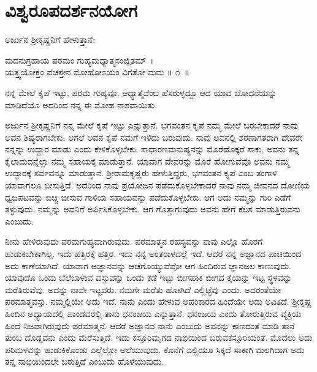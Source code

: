 
\chapter{ವಿಶ್ವರೂಪದರ್ಶನಯೋಗ}

ಅರ್ಜುನ ಶ‍್ರೀಕೃಷ್ಣನಿಗೆ ಹೇಳುತ್ತಾನೆ:

\begin{shloka}
ಮದನುಗ್ರಹಾಯ ಪರಮಂ ಗುಹ್ಯಮಧ್ಯಾತ್ಮಸಂಜ್ಞಿತಮ್~।\\ಯತ್ತ್ವಯೋಕ್ತಂ ವಚಸ್ತೇನ ಮೋಹೋಽಯಂ ವಿಗತೋ ಮಮ \hfill॥ ೧~॥
\end{shloka}

\begin{artha}
ನನ್ನ ಮೇಲೆ ಕೃಪೆ ಇಟ್ಟು, ಪರಮ ಗುಹ್ಯವೂ, ಆಧ್ಯಾತ್ಮವೆಂಬ ಹೆಸರುಳ್ಳದ್ದೂ ಆದ ಯಾವ ಬೋಧನೆಯನ್ನು ಮಾಡಿದೆಯೊ ಅದರಿಂದ ನನ್ನ ಈ ಮೋಹ ನಾಶವಾಯಿತು.
\end{artha}

ಅರ್ಜುನ ಶ‍್ರೀಕೃಷ್ಣನಿಗೆ ನನ್ನ ಮೇಲೆ ಕೃಪೆ ಇಟ್ಟು ಎನ್ನುತ್ತಾನೆ. ಭಗವಂತನ ಕೃಪೆ ನಮ್ಮ ಮೇಲೆ ಬರಬೇಕಾದರೆ ನಾವು ಅವನ ಶಿಷ್ಯರಾಗಬೇಕು. ಆಗಲೆ ಅವನ ಕೃಪೆ ನಮಗೆ ಇಳಿದು ಬರುವುದು. ನಾವು ಅವನಲ್ಲಿ ಶರಣಾಗತರಾಗಿ ದೇವರೇ ನನ್ನನ್ನು ಉದ್ಧಾರ ಮಾಡು ಎಂದು ಕೇಳಿಕೊಳ್ಳಬೇಕು. ಸಾಧಾರಣಮನುಷ್ಯನನ್ನು ಮೊರೆಹೊಕ್ಕರೆ ಸಾಕು, ಅವನು ತನ್ನ ಕೈಲಾದುದನ್ನೆಲ್ಲಾ ನಮ್ಮ ಸಹಾಯಕ್ಕೆ ಮಾಡುತ್ತಾನೆ. ಯಾವಾಗ ದೇವರನ್ನು ಮೊರೆ ಹೋಗುವೆವೊ ಅವನು ನಮ್ಮ ಉದ್ಧಾರಕ್ಕೆ ಸರ್ವವನ್ನೂ ಮಾಡುತ್ತಾನೆ. ಶ‍್ರೀರಾಮಕೃಷ್ಣರು ಹೇಳುತ್ತಿದ್ದರು, ಭಗವಂತನ ಕೃಪೆ ಎಂಬ ತಂಗಾಳಿ ಯಾವಾಗಲೂ ಬೀಸುತ್ತಿದೆ. ಅದರಿಂದ ನಾವು ಪ್ರಯೋಜನ ಪಡೆದುಕೊಳ್ಳಬೇಕಾದರೆ ನಾವು ನಮ್ಮ ಜೀವನದ ದೋಣಿಯ ಧ್ವಜಪಟವನ್ನು ಬಿಚ್ಚಿ ಬೀಸುವ ಗಾಳಿಯ ಸಹಾಯವನ್ನು ಪಡೆದುಕೊಳ್ಳಬೇಕು. ಆಗ ಅದು ನಮ್ಮನ್ನು ಗುರಿ ಎಡೆಗೆ ತಳ್ಳುವುದು. ನಮ್ಮನ್ನು ಅವನಿಗೆ ಅರ್ಪಿಸಿಕೊಳ್ಳಬೇಕು. ಆಗ ಗೊತ್ತಾಗುವುದು ಅವನು ಹೇಗೆ ಕೆಲಸ ಮಾಡುತ್ತಿರುವನು ಎಂಬುದು.

ನೀನು ಹೇಳಿರುವುದು ಪರಮಗುಹ್ಯವಾಗಿರುವುದು. ಪರಮಾತ್ಮನ ರಹಸ್ಯವನ್ನು ನಾವು ಎಲ್ಲೊ ಹೊರಗೆ ಹುಡುಕಬೇಕಾಗಿಲ್ಲ. ಇದು ಹತ್ತಿರಕ್ಕೆ ಹತ್ತಿರ. ಇದು ನನ್ನ ಅಂತರಾಳದಲ್ಲೆ ಇದೆ. ಆದರೆ ನನ್ನ ಅಜ್ಞಾನದ ಪಾಚಿಯಿಂದ ಅದು ಕಾಣೆಯಾಗಿದೆ. ಯಾವಾಗ ಅಜ್ಞಾನವನ್ನು ಆಚೆಗೊಯ್ಯುವೆವೋ ಆಗ ಹಿಂದಿರುವ ಜ್ಞಾನಜಲ ಕಾಣುವುದು. ಯಾವುದೊ ಒಂದು ಬೆಲೆಬಾಳುವ ವಸ್ತುವನ್ನು ಒಂದು ಕಡೆ ಇಟ್ಟು ಬೀಗಹಾಕಿ ಬೀಗದ ಕೈಯನ್ನು ಇಟ್ಟ ಸ್ಥಳವನ್ನು ಮರೆತಿರುವೆವು. ಅದನ್ನು ನಾವೇ ಇಟ್ಟವರು. ನಮಗೇ ಮರೆತು ಹೋಗಿದೆ ಎಲ್ಲಿಟ್ಟೆವು ಎಂದು. ಅದರಂತೆಯೇ ಪರಮಾತ್ಮವಸ್ತು. ನಮ್ಮಲ್ಲಿಯೇ ಅದು ಇದೆ. ನಾನು ಎಂದು ಹೇಳುವ ಅಹಂಕಾರದ ಹಿಂದೆಯೇ ಅದು ಅವಿತಿದೆ. ಶ‍್ರೀಕೃಷ್ಣ ಹಿಂದಿನ ಅಧ್ಯಾಯದಲ್ಲಿ ಪಾಂಡವರಲ್ಲಿ ತಾನು ಧನಂಜಯ ಎನ್ನುತ್ತಾನೆ. ಧನಂಜಯ ಎಂದು ತೋರುತ್ತಿರುವ ವ್ಯಕ್ತಿಯ ಹಿಂದೆ ನಿಜವಾಗಿರುವುದು ಪರಮಾತ್ಮನೆ. ಆದರೆ ಅಜ್ಞಾನದ ನಾನು ಎಂಬುದು ಅವನನ್ನು ಕಾಣದಂತೆ ಮಾಡಿ ತಾನೆ ತುಂಬ ದೊಡ್ಡವನು ಎಂದು ಮೆರೆಸುತ್ತಿದೆ. ಇದು ಕಸ್ತೂರಿಮೃಗದ ನಾಭಿಯಿಂದ ಬರುವ\break ಕಸ್ತೂರಿಯಂತೆ. ಮೊದಲು ಅದು ಪರಿಮಳವನ್ನು ಹುಡುಕಿಕೊಂಡು ಎಲ್ಲೆಲ್ಲೋ ಅಲೆಯುವುದು. ಕೊನೆಗೆ ಎಲ್ಲಿಯೂ ಸಿಕ್ಕದೆ ಸಾಕಾಗಿ ಮಲಗಿದಾಗ ಅದು ತನ್ನ ನಾಭಿಯಿಂದಲೇ ಬರುತ್ತಿದೆ ಎಂಬುದು ಹೊಳೆಯುವುದು.

